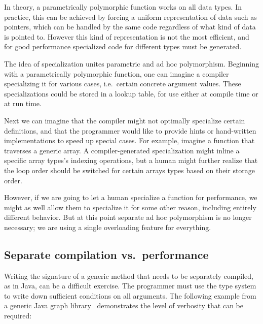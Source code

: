 In theory, a parametrically polymorphic function works on all data
types.
In practice, this can be achieved by forcing a uniform representation of
data such as pointers, which can be handled by the same code regardless of
what kind of data is pointed to.
However this kind of representation is not the most efficient, and
for good performance specialized code for different types must be
generated.

The idea of specialization unites parametric and ad hoc polymorphism.
Beginning with a parametrically polymorphic function, one can imagine
a compiler specializing it for various cases, i.e.\ certain concrete argument
values.
These specializations could be stored in a lookup table, for use
either at compile time or at run time.

Next we can imagine that the compiler might not optimally specialize
certain definitions, and that the programmer would like to provide
hints or hand-written implementations to speed up special cases.
For example, imagine a function that traverses a generic array.
A compiler-generated specialization might inline a specific array types's
indexing operations, but a human might further realize that the loop order
should be switched for certain arrays types based on their storage order.

However, if we are going to let a human specialize a function for performance,
we might as well allow them to specialize it for some other reason, including
entirely different behavior.
But at this point separate ad hoc polymorphism is no longer necessary; we are
using a single overloading feature for everything.

\iffalse
Parametric polymorphism describes code that works for any object precisely
because it does not do anything meaningful to the object, for example the
identity function. In contrast, programming with tagged data (e.g.
symbolic expression systems, XML) permits code to work for any object
because every object has the same structure, allowing meaningful
operations.
\fi

\subsection{Separate compilation vs.\ performance}

Writing the signature of a generic method that needs to be separately compiled,
as in Java, can be a difficult exercise.
The programmer must use the type system to write down sufficient conditions on all
arguments.
The following example from a generic Java graph
library~\cite{Garcia:2003:CSL:949305.949317} demonstrates the level of verbosity
that can be required:

